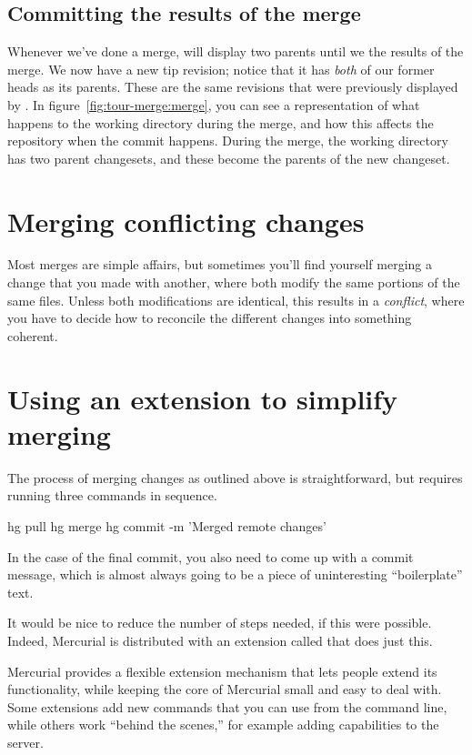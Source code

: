 \subsection{Committing the results of the merge}

Whenever we've done a merge,  will display two parents
until we  the results of the merge.
We now have a new tip revision; notice that it has \emph{both} of
our former heads as its parents.  These are the same revisions that
were previously displayed by .
In figure~\ref{fig:tour-merge:merge}, you can see a representation of
what happens to the working directory during the merge, and how this
affects the repository when the commit happens.  During the merge, the
working directory has two parent changesets, and these become the
parents of the new changeset.

\section{Merging conflicting changes}

Most merges are simple affairs, but sometimes you'll find yourself
merging a change that you made with another, where both modify the
same portions of the same files.  Unless both modifications are
identical, this results in a \emph{conflict}, where you have to decide
how to reconcile the different changes into something coherent.

\section{Using an extension to simplify merging}

The process of merging changes as outlined above is straightforward,
but requires running three commands in sequence.
\begin{codesample2}
  hg pull
  hg merge
  hg commit -m 'Merged remote changes'
\end{codesample2}
In the case of the final commit, you also need to come up with a
commit message, which is almost always going to be a piece of
uninteresting ``boilerplate'' text.

It would be nice to reduce the number of steps needed, if this were
possible.  Indeed, Mercurial is distributed with an extension called
 that does just this.

Mercurial provides a flexible extension mechanism that lets people
extend its functionality, while keeping the core of Mercurial small
and easy to deal with.  Some extensions add new commands that you can
use from the command line, while others work ``behind the scenes,''
for example adding capabilities to the server.

